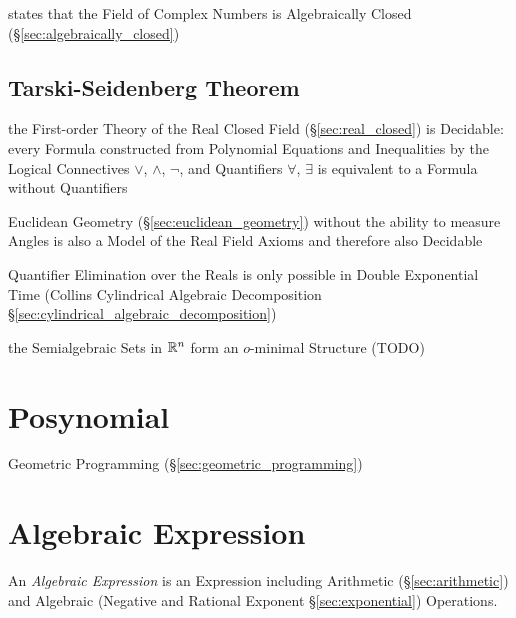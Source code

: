 states that the Field of Complex Numbers is Algebraically Closed
(\S\ref{sec:algebraically_closed})



\subsection{Tarski-Seidenberg Theorem}\label{sec:tarski_seidenberg}

the First-order Theory of the Real Closed Field (\S\ref{sec:real_closed}) is
Decidable: every Formula constructed from Polynomial Equations and Inequalities
by the Logical Connectives $\vee$, $\wedge$, $\neg$, and Quantifiers $\forall$,
$\exists$ is equivalent to a Formula without Quantifiers

Euclidean Geometry (\S\ref{sec:euclidean_geometry}) without the ability to
measure Angles is also a Model of the Real Field Axioms and therefore also
Decidable

Quantifier Elimination over the Reals is only possible in Double Exponential
Time (Collins Cylindrical Algebraic Decomposition
\S\ref{sec:cylindrical_algebraic_decomposition})

the Semialgebraic Sets in $\mathbb{R}^n$ form an $o$-minimal Structure (TODO)



\section{Posynomial}\label{sec:posynomial}

Geometric Programming (\S\ref{sec:geometric_programming})



\section{Algebraic Expression}\label{sec:algebraic_expression}

An \emph{Algebraic Expression} is an Expression including Arithmetic
(\S\ref{sec:arithmetic}) and Algebraic (Negative and Rational Exponent
\S\ref{sec:exponential}) Operations.

